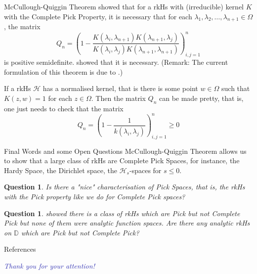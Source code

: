 \documentclass{beamer}
\newtheorem{question}[theorem]{Question}
\newcommand{\D}{\mathbb D}
\newcommand{\calH}{{\mathcal H}}
\begin{document}
\begin{frame}{McCullough-Quiggin Theorem}
\citeauthor{zbMATH00222166} \cite{zbMATH00222166} showed that for a rkHs with (irreducible) kernel $K$ with the Complete Pick Property, it is necessary that for each $\lambda_{1}, \lambda_{2}, \ldots, \lambda_{n+1}\in \Omega$, the matrix
\begin{equation*}
Q_{n} = \left( 1-\frac{K\left( \lambda_{i}, \lambda_{n+1} \right)K\left( \lambda_{n+1}, \lambda_{j} \right)}{K\left( \lambda_{i}, \lambda_{j} \right) K\left( \lambda_{n+1}, \lambda_{n+1} \right)} \right)_{i,j=1}^{n}
\end{equation*}
is positive semidefinite. \citeauthor{MR1284929} \cite{MR1284929} showed that it is necessary. (Remark: The current formulation of this theorem is due to \citeauthor{MR1774853} \cite{MR1774853}.) 

If a rkHs $\calH$ has a normalised kernel, that is there is some point $w \in \Omega$ such that $K \left( z,w \right) = 1$ for each $z \in \Omega$. Then the matrix $Q_{n}$ can be made pretty, that is, one just needs to check that the matrix
\begin{equation*}
Q_{n} = \left( 1-\frac{1}{k\left( \lambda_{i}, \lambda_{j} \right)} \right)_{i,j=1}^{n} \ge 0
\end{equation*}
\end{frame}

\begin{frame}{Final Words and some Open Questions}
McCullough-Quiggin Theorem allows us to show that a large class of rkHs are Complete Pick Spaces, for instance, the Hardy Space, the Dirichlet space, the $\calH _{s}$-spaces for $s\le 0$. \pause
\begin{question}
Is there a "nice" characterisation of Pick Spaces, that is, the rkHs with the Pick property like we do for Complete Pick spaces?
\end{question}
\pause
\begin{question}
\citeauthor{MR2187439} \cite{MR2187439} showed there is a class of rkHs which are Pick but not Complete Pick but none of them were analytic function spaces. Are there any analytic rkHs on $\D$ which are Pick but not Complete Pick?
\end{question}
\end{frame}

\begin{frame}[allowframebreaks]{References}
\nocite{*}
\printbibliography
\end{frame}
\begin{frame}
  \centering \Large
  \textcolor[HTML]{3333B3}{\emph{Thank you for your attention!}}
\end{frame}
\end{document}
